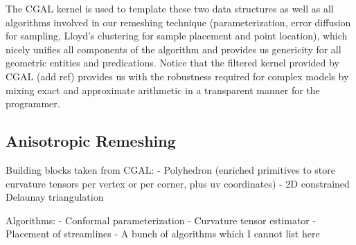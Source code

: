 The CGAL kernel is used to template these two data structures as well
as all algorithms involved in our remeshing technique
(parameterization, error diffusion for sampling, Lloyd's clustering
for sample placement and point location), which nicely unifies all
components of the algorithm and provides us genericity for all
geometric entities and predications. Notice that the filtered kernel
provided by CGAL (add ref) provides us with the robustness required
for complex models by mixing exact and approximate arithmetic in a
transparent manner for the programmer.

\subsection{Anisotropic Remeshing}

Building blocks taken from CGAL:
- Polyhedron (enriched primitives to store curvature tensors per
vertex or per corner, plus uv coordinates)
- 2D constrained Delaunay triangulation

Algorithms:
- Conformal parameterization
- Curvature tensor estimator
- Placement of streamlines
- A bunch of algorithms which I cannot list here

